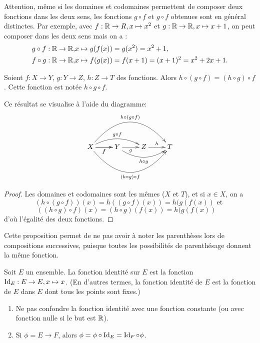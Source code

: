 \begin{attention}
Attention, même si les domaines et codomaines permettent de composer deux fonctions dans les deux sens, les fonctions $g\circ f$ et $g\circ f$ obtenues sont en général distinctes. Par exemple, avec $f : \mathbb{R}\to R, x\mapsto x^2
$ et $g : \mathbb{R}\to \mathbb{R}, x\mapsto x+1$,  on peut composer dans les deux sens mais on a :
\begin{align*}
g\circ f : \mathbb{R}\to \mathbb{R}, & x\mapsto g(f(x)) = g(x^2) = x^2+1,\\
f\circ g : \mathbb{R}\to \mathbb{R}, & x\mapsto f(g(x)) = f(x+1) = (x+1)^2 = x^2+2x+1.
\end{align*}
\end{attention}


\begin{proposition}
Soient $f : X\to Y$, $g : Y\to Z$, $h  : Z\to T$ des fonctions. Alors $h\circ (g\circ f) = (h\circ g)\circ f$. Cette fonction est notée $h\circ g\circ f$.

Ce résultat se visualise à l'aide du diagramme:
\[
\xymatrix{
X \ar[r]_{f} \ar@/^1pc/[rr]^{g\circ f} \ar[r]_{f} \ar@/^3pc/[rrr]^{h\circ (g\circ f)} \ar@/_3pc/[rrr]_{(h\circ g) \circ f}& Y \ar[r]_{g} \ar@/_1.2pc/[rr]_{h\circ g} & Z \ar[r]^{h} & T
}
\]

\end{proposition}
\begin{proof}
Les domaines et codomaines sont les mêmes ($X$ et $T$), et si $x\in X$, on a 
\[ \left(h\circ (g\circ f)\right) (x) = h((g\circ f)(x)) = h(g(f(x)) \text{ et } \]
\[ \left( (h\circ g)\circ f \right) (x) = (h \circ g)(f(x)) = h(g(f(x))\quad \]
d'où l'égalité des deux fonctions.
\end{proof}

Cette proposition permet de ne pas avoir à noter les parenthèses lors de compositions successives, puisque toutes les possibilités de parenthésage donnent la même fonction.

\begin{definition}
Soit $E$ un ensemble. La fonction identité sur $E$ est la fonction $\operatorname{Id}_E : E\to E, x\mapsto x$. (En d'autres termes, la fonction identité de $E$ est la fonction de $E$ dans $E$ dont tous les points sont fixes.)
\end{definition}

\begin{attention}
\begin{enumerate}
\item Ne pas confondre la fonction identité avec une fonction constante (ou avec fonction nulle si le but est $\mathbb{R}$).
\item Si $\phi = E\to F$, alors $\phi = \phi\circ \operatorname{Id}_E = \operatorname{Id}_F\circ \phi$.
\end{enumerate}
\end{attention}


